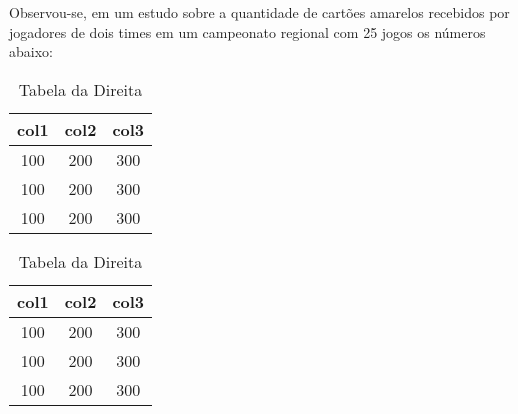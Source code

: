 \documentclass{report}
\begin{document}


\begin{Exercise}

\Question Observou-se, em um estudo sobre a quantidade de cartões amarelos recebidos por jogadores de dois times em um campeonato regional com 25 jogos os números abaixo:
\begin{table}[h]
 \begin{minipage}{.5\textwidth}
 \centering
 \caption{Tabela da Esquerda}
 \begin{tabular}{ccc}
 \toprule
 col1&col2&col3\\ \midrule
 100&200&300\\
 100&200&300\\
 100&200&300\\ \bottomrule
 \end{tabular}
  
 \end{minipage} 
 \begin{minipage}{.5\textwidth}
 \centering
 \caption{Tabela da Direita}
 \begin{tabular}{ccc}
 \toprule
 col1&col2&col3\\ \midrule
 100&200&300\\
 100&200&300\\
 100&200&300\\ \bottomrule
 \end{tabular}
  
 \end{minipage}%
\end{table}

\end{Exercise}
\end{document}
